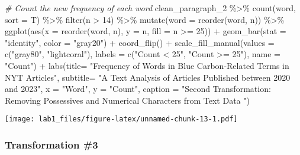 \documentclass[
]{article}
\newenvironment{Shaded}{\begin{snugshade}}{\end{snugshade}}
\newcommand{\AttributeTok}[1]{\textcolor[rgb]{0.77,0.63,0.00}{#1}}
\newcommand{\CommentTok}[1]{\textcolor[rgb]{0.56,0.35,0.01}{\textit{#1}}}
\newcommand{\DecValTok}[1]{\textcolor[rgb]{0.00,0.00,0.81}{#1}}
\newcommand{\FunctionTok}[1]{\textcolor[rgb]{0.00,0.00,0.00}{#1}}
\newcommand{\NormalTok}[1]{#1}
\newcommand{\SpecialCharTok}[1]{\textcolor[rgb]{0.00,0.00,0.00}{#1}}
\newcommand{\StringTok}[1]{\textcolor[rgb]{0.31,0.60,0.02}{#1}}
\begin{document}
\begin{Shaded}
\begin{Highlighting}[]
\CommentTok{\# Count the new frequency of each word}
\NormalTok{clean\_paragraph\_2 }\SpecialCharTok{\%\textgreater{}\%}
  \FunctionTok{count}\NormalTok{(word, }\AttributeTok{sort =}\NormalTok{ T) }\SpecialCharTok{\%\textgreater{}\%}
  \FunctionTok{filter}\NormalTok{(n }\SpecialCharTok{\textgreater{}} \DecValTok{14}\NormalTok{) }\SpecialCharTok{\%\textgreater{}\%}
  \FunctionTok{mutate}\NormalTok{(}\AttributeTok{word =} \FunctionTok{reorder}\NormalTok{(word, n)) }\SpecialCharTok{\%\textgreater{}\%}
  \FunctionTok{ggplot}\NormalTok{(}\FunctionTok{aes}\NormalTok{(}\AttributeTok{x =} \FunctionTok{reorder}\NormalTok{(word, n), }\AttributeTok{y =}\NormalTok{ n, }\AttributeTok{fill =}\NormalTok{ n }\SpecialCharTok{\textgreater{}=} \DecValTok{25}\NormalTok{)) }\SpecialCharTok{+}
  \FunctionTok{geom\_bar}\NormalTok{(}\AttributeTok{stat =} \StringTok{"identity"}\NormalTok{, }\AttributeTok{color =} \StringTok{"gray20"}\NormalTok{) }\SpecialCharTok{+}
  \FunctionTok{coord\_flip}\NormalTok{() }\SpecialCharTok{+}
  \FunctionTok{scale\_fill\_manual}\NormalTok{(}\AttributeTok{values =} \FunctionTok{c}\NormalTok{(}\StringTok{"gray80"}\NormalTok{, }\StringTok{"lightcoral"}\NormalTok{), }
                    \AttributeTok{labels =} \FunctionTok{c}\NormalTok{(}\StringTok{"Count \textless{} 25"}\NormalTok{, }\StringTok{"Count \textgreater{}= 25"}\NormalTok{), }
                    \AttributeTok{name =} \StringTok{"Count"}\NormalTok{)  }\SpecialCharTok{+}
  \FunctionTok{labs}\NormalTok{(}\AttributeTok{title=} \StringTok{"Frequency of Words in Blue Carbon{-}Related Terms in NYT Articles"}\NormalTok{,}
       \AttributeTok{subtitle=} \StringTok{"A Text Analysis of Articles Published between 2020 and 2023"}\NormalTok{,}
       \AttributeTok{x =} \StringTok{"Word"}\NormalTok{,}
       \AttributeTok{y =} \StringTok{"Count"}\NormalTok{,}
       \AttributeTok{caption =} \StringTok{"Second Transformation: Removing Possessives and Numerical Characters from Text Data "}\NormalTok{)}
\end{Highlighting}
\end{Shaded}

\texttt{[image: lab1\_files/figure-latex/unnamed-chunk-13-1.pdf]}

\hypertarget{transformation-3}{%
\subsubsection{Transformation \#3}\label{transformation-3}}
\end{document}
